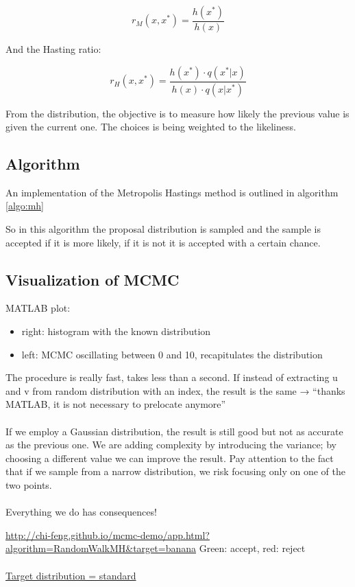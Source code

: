 $$r_M(x,x^*)=\frac{h(x^*)}{h(x)}$$

And the Hasting ratio:

$$r_H(x,x^*)=\frac{h(x^*)\cdot q(x^*|x)}{h(x)\cdot q(x|x^*)}$$

From the distribution, the objective is to measure how likely the previous value is given the current one.
The choices is being weighted to the likeliness.

  \subsection{Algorithm}
  An implementation of the Metropolis Hastings method is outlined in algorithm \ref{algo:mh}

  

  So in this algorithm the proposal distribution is sampled and the sample is accepted if it is more likely, if it is not it is accepted with a certain chance.


  \subsection{Visualization of MCMC}
  MATLAB plot:

  \begin{itemize}
  \tightlist
  \item
    right: histogram with the known distribution
  \item
    left: MCMC oscillating between 0 and 10, recapitulates the
    distribution
  \end{itemize}
  \noindent
  The procedure is really fast, takes less than a second. If instead of
  extracting u and v from random distribution with an index, the result is
  the same → ``thanks MATLAB, it is not necessary to prelocate anymore''
  \\
  \\
  \noindent
  If we employ a Gaussian distribution, the result is still good but not
  as accurate as the previous one. We are adding complexity by introducing
  the variance; by choosing a different value we can improve the result.
  Pay attention to the fact that if we sample from a narrow distribution,
  we risk focusing only on one of the two points.
  \\
  \\
  \noindent
  Everything we do has consequences!

  \url{http://chi-feng.github.io/mcmc-demo/app.html?algorithm=RandomWalkMH\&target=banana}
  \noindent
  Green: accept, red: reject
  \\
  \\
  \noindent
  \underline{Target distribution = standard}

